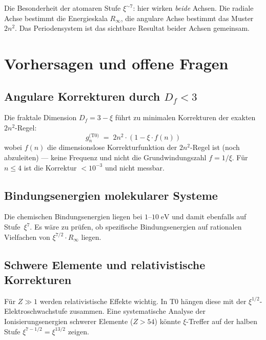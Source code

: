 \vspace{0.5em}

Die Besonderheit der atomaren Stufe $\xi^{\sim 7}$: hier wirken
\emph{beide} Achsen. Die radiale Achse bestimmt die Energieskala $R_\infty$,
die angulare Achse bestimmt das Muster $2n^2$. Das Periodensystem ist
das sichtbare Resultat beider Achsen gemeinsam.

\section{Vorhersagen und offene Fragen}
\label{sec:vorhersagen}

\subsection{Angulare Korrekturen durch \texorpdfstring{$D_f < 3$}{Df<3}}

Die fraktale Dimension $D_f = 3 - \xi$ führt zu minimalen Korrekturen
der exakten $2n^2$-Regel:
\begin{equation}
  g_n^\text{(T0)} \;=\; 2n^2 \cdot (1 - \xi \cdot f(n))
\end{equation}
wobei $f(n)$ die dimensionslose Korrekturfunktion der $2n^2$-Regel ist (noch abzuleiten) --- keine Frequenz und nicht die Grundwindungszahl $f = 1/\xi$.
Für $n \leq 4$ ist die Korrektur $< 10^{-3}$ und nicht messbar.

\subsection{Bindungsenergien molekularer Systeme}

Die chemischen Bindungsenergien liegen bei $1$–$10\;\text{eV}$ und damit
ebenfalls auf Stufe~$\xi^7$. Es wäre zu prüfen, ob spezifische Bindungsenergien
auf rationalen Vielfachen von $\xi^{7/2} \cdot R_\infty$ liegen.

\subsection{Schwere Elemente und relativistische Korrekturen}

Für $Z \gg 1$ werden relativistische Effekte wichtig. In T0 hängen diese
mit der $\xi^{1/2}$-Elektroschwachstufe zusammen. Eine systematische
Analyse der Ionisierungsenergien schwerer Elemente ($Z > 54$) könnte
$\xi$-Treffer auf der halben Stufe $\xi^{7-1/2} = \xi^{13/2}$ zeigen.

